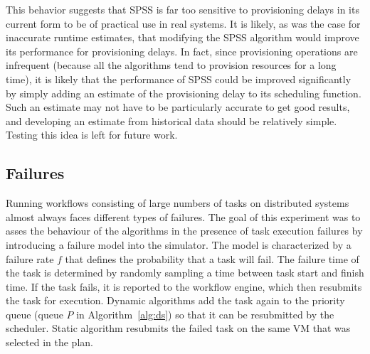 \documentclass[conference]{IEEEtran}
\begin{document}
This behavior suggests that SPSS is far too sensitive to provisioning delays in its current form to be of practical use in real systems. It is likely, as was the case for inaccurate runtime estimates, that modifying the SPSS algorithm would improve its performance for provisioning delays. In fact, since provisioning operations are infrequent (because all the algorithms tend to provision resources for a long time), it is likely that the performance of SPSS could be improved significantly by simply adding an estimate of the provisioning delay to its scheduling function. Such an estimate may not have to be particularly accurate to get good results, and developing an estimate from historical data should be relatively simple. Testing this idea is left for future work.

\subsection{Failures}
\label{sec:failures}

Running workflows consisting of large numbers of tasks on distributed systems
almost always faces different types of failures. The goal of this experiment was
to asses the behaviour of the algorithms in the presence of task execution
failures by introducing a failure model into the simulator. The model is
characterized by a failure rate $f$ that defines the probability that a task
will fail. The failure time of the task is determined by randomly sampling a
time between task start and finish time. If the task fails, it is reported to
the workflow engine, which then resubmits the task for execution. Dynamic algorithms
add the task again to the priority queue (queue $P$ in Algorithm~\ref{alg:ds})
so that it can be resubmitted by the scheduler. Static algorithm resubmits the
failed task on the same VM that was selected in the plan.
\end{document}
